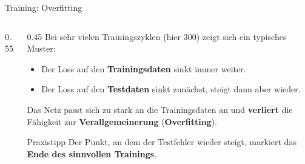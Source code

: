 \begin{frame}{Training: Overfitting}
  \footnotesize
\begin{columns}
\begin{column}{0.55\textwidth}
\centering

\end{column}
\begin{column}{0.45\textwidth}
Bei sehr vielen Trainingszyklen (hier 300) zeigt sich ein typisches Muster:
\begin{itemize}
\item Der Loss auf den \textbf{Trainingsdaten} sinkt immer weiter.
\item Der Loss auf den \textbf{Testdaten} sinkt zunächst, steigt dann aber wieder.
\end{itemize}
Das Netz passt sich zu stark an die Trainingsdaten an und \textbf{verliert} die Fähigkeit zur \textbf{Verallgemeinerung} (\textbf{Overfitting}).

\vspace{0.5em}
\begin{block}{\footnotesize Praxistipp}
Der Punkt, an dem der Testfehler wieder steigt, markiert das \textbf{Ende des sinnvollen Trainings}.
\end{block}
\end{column}
\end{columns}
\end{frame}


